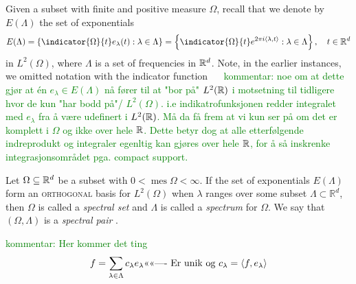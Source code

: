 \documentclass[../thesis.tex]{subfiles}
\begin{document}
Given a subset with finite and positive measure $\Omega$, recall that we denote by $E(\Lambda)$ the set of exponentials
\begin{align}\label{eq:exp_set_all_d}
    E(\Lambda) = \braqMed{\indicator{\Omega}{t} e_\lambda(t) : \lambda \in \Lambda} = \braqMed{\indicator{\Omega}{t} e^{2 \pi i \inpl{t}} : \lambda \in \Lambda}, \quad t\in \R^d%
\end{align}
in $L^2(\Omega)$, where $\Lambda$ is a set of frequencies in $\mathbb{R}^d$. Note, in the earlier instances, we omitted notation with the indicator function $\quad$ \textcolor{green}{kommentar: noe om at dette gjør at én $e_\lambda \in E(\Lambda)$ nå fører til at "bor på" $L^2(\mathbb{R})$ i motsetning til tidligere hvor de kun "har bodd på"/ $L^2(\Omega)$. i.e indikatrofunksjonen redder integralet med $e_\lambda$ fra å være udefinert i $L^2(\mathbb{R})$. Må da få frem at vi kun ser på om det er komplett i $\Omega$ og ikke over hele $\mathbb{R}$. Dette betyr dog at alle etterfølgende indreprodukt og integraler egenltig kan gjøres over hele $\mathbb{R}$, for å så inskrenke integrasjonsområdet pga. compact support.}
\begin{definition} \label{def:spectral_set}
    Let $\Omega \subseteq \mathbb{R}^d$ be a subset with $0< \operatorname{mes} \Omega < \infty$. If the set of exponentials $E(\Lambda)$ form an \textsc{orthogonal} basis for $L^2 (\Omega)$ when $\lambda$ ranges over some subset $\Lambda \subset \mathbb{R}^d$, then $\Omega$ is called a \emph{spectral set} and $\Lambda$ is called a \emph{spectrum} for $\Omega$. We say that $(\Omega, \Lambda)$ is a \emph{spectral pair} \cite{liuUniformityNonUniformGabor2003}.
\end{definition}

\textcolor{green}{kommentar: Her kommer det ting}
\begin{equation*}
    f = \sum_{\lambda \in \Lambda} c_\lambda e_\lambda \text{<<<<----  Er unik og } c_\lambda = \langle f,e_\lambda\rangle
\end{equation*}
\end{document}
